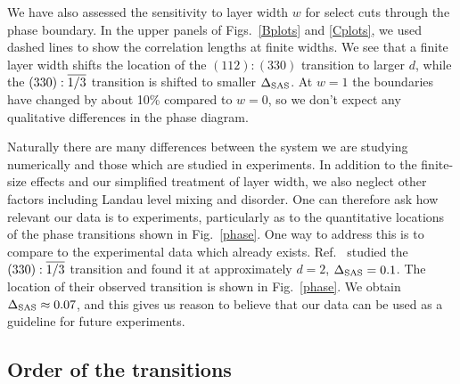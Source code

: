 We have also assessed the sensitivity to layer width $w$ for select cuts through the phase boundary.
In the upper panels of Figs.~\ref{Bplots} and \ref{Cplots}, we used dashed lines to show the correlation lengths at finite widths.
We see that a finite layer width shifts the location of the $(112):(330)$ transition to larger $d$, while the $(330):\overline{1/3}$ transition is shifted to smaller $\Delta_\textrm{SAS}$. 
At $w = 1$ the boundaries have changed by about 10\% compared to $w = 0$, so we don't expect any qualitative differences in the phase diagram.

Naturally there are many differences between the system we are studying numerically and those which are studied in experiments.
 In addition to the finite-size effects and our simplified treatment of layer width, we also neglect other factors including Landau level mixing and  disorder. 
 One can therefore ask how relevant our data is to experiments, particularly as to the quantitative locations of the phase transitions shown in Fig.~\ref{phase}.
 One way to address this is to compare to the experimental data which already exists.
Ref.~\cite{Hirayama2002b} studied the $(330):\overline{1/3}$ transition and found it at approximately $d=2$, $\Delta_\textrm{SAS}=0.1$.
The location of their observed transition is shown in Fig.~\ref{phase}. 
We obtain $\Delta_\textrm{SAS} \approx 0.07$, and this gives us reason to believe that our data can be used as a guideline for future experiments. 

\subsection{Order of the transitions}\label{sec:order}

